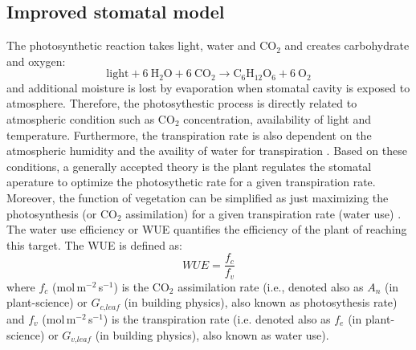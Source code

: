 \subsection{Improved stomatal model}

The photosynthetic reaction takes light, water and CO$_2$ and creates carbohydrate and oxygen:
\begin{equation}
\mathrm{light} + 6~\mathrm{H}_2\mathrm{O} + 6~\mathrm{C}\mathrm{O}_2 \rightarrow \mathrm{C}_6\mathrm{H}_{12}\mathrm{O}_6  + 6~\mathrm{O}_2 
\end{equation}
and additional moisture is lost by evaporation when stomatal cavity is exposed to atmosphere. Therefore, the photosythestic process is directly related to atmospheric condition such as CO$_2$ concentration, availability of light and temperature. Furthermore, the transpiration rate is also dependent on the atmospheric humidity and the availity of water for transpiration \citep{Ball1987,Leuning1995}. Based on these conditions, a generally accepted theory is the plant regulates the stomatal aperature to optimize the photosythetic rate for a given transpiration rate. Moreover, the function of vegetation can be simplified as just maximizing the photosynthesis (or CO$_2$ assimilation) for a given transpiration rate (water use) \citep{Medlyn2011}. The water use efficiency or WUE quantifies the efficiency of the plant of reaching this target. The WUE is defined as:
\begin{equation}
\textit{WUE} = \frac{f_c}{f_v}
\end{equation}
where $f_c$ (mol\,m$^{-2}$\,s$^{-1}$) is the CO$_2$ assimilation rate (i.e., denoted also as $A_n$ (in plant-science) or $G_{\textit{c,leaf}}$ (in building physics), also known as photosythesis rate) and $f_v$  (mol\,m$^{-2}$\,s$^{-1}$) is the transpiration rate (i.e. denoted also as $f_e$ (in plant-science) or $G_{\textit{v,leaf}}$ (in building physics), also known as water use).  


